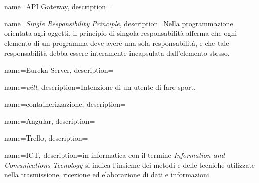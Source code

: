 {
    name={API Gateway},
    description={}
}


{
    name=\textit{Single Responsibility Principle},
    description={Nella programmazione orientata agli oggetti, il principio di singola responsabilità afferma che ogni elemento di un programma deve avere una sola responsabilità, e che tale responsabilità debba essere interamente incapsulata dall'elemento stesso.}
}

{
    name={Eureka Server},
    description={}
}


{
    name={\textit{will}},
    description={Intenzione di un utente di fare sport.}
}


{
    name={containerizzazione},
    description={}
}

{
    name={Angular},
    description={}
}

{
    name={Trello},
    description={}
}

{
    name={ICT},
    description={in informatica con il termine \textit{Information and Comunications Tecnology} 
    si indica l'insieme dei metodi e delle tecniche utilizzate nella trasmissione, ricezione 
    ed elaborazione di dati e informazioni.}
}


